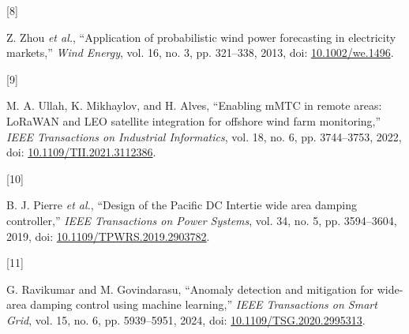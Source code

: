 \documentclass[
  journal]{IEEEtran}
\newlength{\cslhangindent}
\newlength{\csllabelwidth}
\newenvironment{CSLReferences}[2] %
 {\begin{list}{}{%
  \setlength{\itemindent}{0pt}
  \setlength{\leftmargin}{0pt}
  \setlength{\parsep}{0pt}
  \ifodd #1
   \setlength{\leftmargin}{\cslhangindent}
   \setlength{\itemindent}{-1\cslhangindent}
  \fi
  \setlength{\itemsep}{#2\baselineskip}}}
 {\end{list}}
\newcommand{\CSLLeftMargin}[1]{\parbox[t]{\csllabelwidth}{\strut#1\strut}}
\newcommand{\CSLRightInline}[1]{\parbox[t]{\linewidth - \csllabelwidth}{\strut#1\strut}}
\begin{document}
\begin{CSLReferences}{0}{0}
\CSLLeftMargin{{[}8{]} }%
\CSLRightInline{Z. Zhou \emph{et al.}, {``Application of probabilistic
wind power forecasting in electricity markets,''} \emph{Wind Energy},
vol. 16, no. 3, pp. 321--338, 2013, doi:
\href{https://doi.org/10.1002/we.1496}{10.1002/we.1496}.}

\CSLLeftMargin{{[}9{]} }%
\CSLRightInline{M. A. Ullah, K. Mikhaylov, and H. Alves, {``Enabling
{mMTC} in remote areas: {LoRaWAN} and {LEO} satellite integration for
offshore wind farm monitoring,''} \emph{IEEE Transactions on Industrial
Informatics}, vol. 18, no. 6, pp. 3744--3753, 2022, doi:
\href{https://doi.org/10.1109/TII.2021.3112386}{10.1109/TII.2021.3112386}.}

\CSLLeftMargin{{[}10{]} }%
\CSLRightInline{B. J. Pierre \emph{et al.}, {``Design of the {Pacific DC
Intertie} wide area damping controller,''} \emph{IEEE Transactions on
Power Systems}, vol. 34, no. 5, pp. 3594--3604, 2019, doi:
\href{https://doi.org/10.1109/TPWRS.2019.2903782}{10.1109/TPWRS.2019.2903782}.}

\CSLLeftMargin{{[}11{]} }%
\CSLRightInline{G. Ravikumar and M. Govindarasu, {``Anomaly detection
and mitigation for wide-area damping control using machine learning,''}
\emph{IEEE Transactions on Smart Grid}, vol. 15, no. 6, pp. 5939--5951,
2024, doi:
\href{https://doi.org/10.1109/TSG.2020.2995313}{10.1109/TSG.2020.2995313}.}

\end{CSLReferences}
\end{document}
